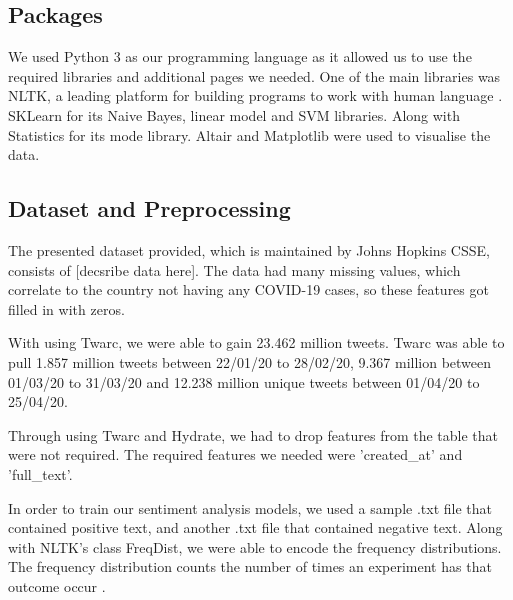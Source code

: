 \documentclass[a4paper,10pt]{article}
\begin{document}
\subsection{Packages}
We used Python 3 \cite{Python} as our programming language as it allowed us to use the required libraries and additional pages we needed. One of the main libraries was NLTK, a leading platform for building programs to work with human language \cite{nltk}. SKLearn \cite{sklearn_api} for its Naive Bayes, linear model and SVM libraries. Along with Statistics for its mode library. Altair and Matplotlib were used to visualise the data.



\subsection{Dataset and Preprocessing}
The presented dataset provided, which is maintained by Johns Hopkins CSSE, consists of [decsribe data here]. The data had many missing values, which correlate to the country not having any COVID-19 cases, so these features got filled in with zeros.

With using Twarc, we were able to gain 23.462 million tweets. Twarc was able to pull 1.857 million tweets between 22/01/20 to 28/02/20, 9.367 million between 01/03/20 to 31/03/20 and 12.238 million unique tweets between 01/04/20 to 25/04/20.

Through using Twarc and Hydrate, we had to drop features from the table that were not required. The required features we needed were 'created\_at' and 'full\_text'.

In order to train our sentiment analysis models, we used a sample .txt file that contained positive text, and another .txt file that contained negative text. Along with NLTK's class FreqDist, we were able to encode the frequency distributions. The frequency distribution counts the number of times an experiment has that outcome occur \cite{nltkfreqdist}.
\end{document}
